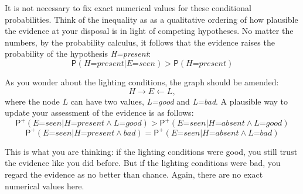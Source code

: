 \documentclass[
  11pt,
  dvipsnames,enabledeprecatedfontcommands]{scrartcl}
\newcommand{\pr}[1]{\ensuremath{\mathsf{P}(#1)}}
\newcommand{\ppr}[2]{\ensuremath{\mathsf{P}^{#1}(#2)}}
\begin{document}
\noindent It is not necessary to fix exact numerical values for these
conditional probabilities. Think of the inequality as as a qualitative
ordering of how plausible the evidence at your disposal is in light of
competing hypotheses. No matter the numbers, by the probability
calculus, it follows that the evidence raises the probability of the
hypothesis \textit{H=present}:
\[\pr{\textit{H=present}\vert \textit{E=seen}} > \pr{\textit{H=present}}\]

\noindent As you wonder about the lighting conditions, the graph should
be amended: \[H \rightarrow E \leftarrow L,\] where the node \(L\) can
have two values, \textit{L=good} and \textit{L=bad}. A plausible way to
update your assessment of the evidence is as follows:
\[\ppr{+}{\textit{E=seen} \vert \textit{H=present} \wedge \textit{L=good}} > \ppr{+}{\textit{E=seen} \vert \textit{H=absent} \wedge \textit{L=good}}\]
\[\ppr{+}{\textit{E=seen} \vert \textit{H=present} \wedge \textit{bad}} = \ppr{+}{\textit{E=seen} \vert \textit{H=absent} \wedge \textit{L=bad}}\]

\noindent This is what you are thinking: if the lighting conditions were
good, you still trust the evidence like you did before. But if the
lighting conditions were bad, you regard the evidence as no better than
chance. Again, there are no exact numerical values here.
\end{document}
